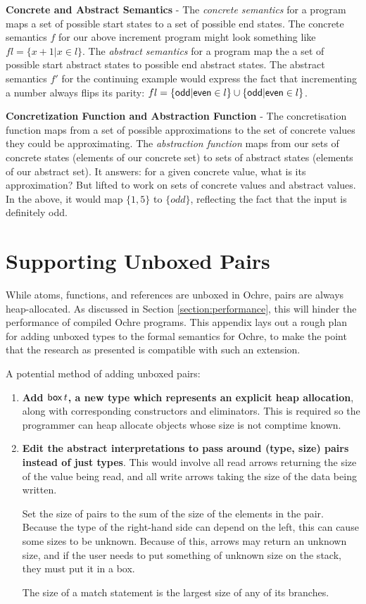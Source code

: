 \documentclass[12pt,twoside]{report}
\begin{document}
\textbf{Concrete and Abstract Semantics} - The \textit{concrete semantics} for a program maps a set of possible start states to a set of possible end states. The concrete semantics $f$ for our above increment program might look something like $f l = \{ x + 1 | x \in l \}$. The \textit{abstract semantics} for a program map the a set of possible start abstract states to possible end abstract states. The abstract semantics $f'$ for the continuing example would express the fact that incrementing a number always flips its parity: $f l = \{ \mathsf{odd} | \mathsf{even} \in l \} \cup \{ \mathsf{odd} | \mathsf{even} \in l \}$.

\textbf{Concretization Function and Abstraction Function} - The concretisation function maps from a set of possible approximations to the set of concrete values they could be approximating. The \textit{abstraction function} maps from our sets of concrete states (elements of our concrete set) to sets of abstract states (elements of our abstract set). It answers: for a given concrete value, what is its approximation? But lifted to work on sets of concrete values and abstract values. In the above, it would map $\{1, 5\}$ to $\{ odd \}$, reflecting the fact that the input is definitely odd.

\section{Supporting Unboxed Pairs}
\label{appendix:unbox}
While atoms, functions, and references are unboxed in Ochre, pairs are always heap-allocated. As discussed in Section \ref{section:performance}, this will hinder the performance of compiled Ochre programs. This appendix lays out a rough plan for adding unboxed types to the formal semantics for Ochre, to make the point that the research as presented is compatible with such an extension.

A potential method of adding unboxed pairs:

\begin{enumerate}
  \item \textbf{Add $\mathsf{box} \, t$, a new type which represents an explicit heap allocation}, along with corresponding constructors and eliminators. This is required so the programmer can heap allocate objects whose size is not comptime known.
  \item \textbf{Edit the abstract interpretations to pass around (type, size) pairs instead of just types}. This would involve all read arrows returning the size of the value being read, and all write arrows taking the size of the data being written.
  
  Set the size of pairs to the sum of the size of the elements in the pair. Because the type of the right-hand side can depend on the left, this can cause some sizes to be unknown. Because of this, arrows may return an unknown size, and if the user needs to put something of unknown size on the stack, they must put it in a box.

  The size of a match statement is the largest size of any of its branches.
\end{enumerate}
\end{document}
